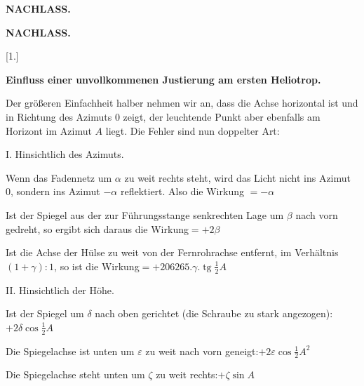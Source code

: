 \clearpage
\noindent{}\hfill{\small\textbf{NACHLASS.}}\hfill\null\par
\vspace*{32mm}
\begin{center}
{\Large\bfseries NACHLASS.}\par\vspace{15mm}
[1.]\par\medskip
\textbf{Einfluss einer unvollkommenen Justierung am ersten Heliotrop.}
\end{center}
Der größeren Einfachheit halber nehmen wir an, dass die Achse horizontal
ist und in Richtung des Azimuts 0 zeigt, der leuchtende Punkt aber ebenfalls
am Horizont im Azimut $A$ liegt. Die Fehler sind nun doppelter Art:

\noindent I. Hinsichtlich des Azimuts.
\begin{list}{}{\setlength{\leftmargin}{9mm}\setlength{\labelwidth}{6mm}\setlength{\itemsep}{2pt}\setlength{\parsep}{0pt}\setlength{\topsep}{3pt}}
\item[1.] Wenn das Fadennetz um $\alpha$ zu weit rechts steht,
wird das Licht nicht ins Azimut 0, sondern ins Azimut
$-\alpha$ reflektiert. Also die Wirkung $=-\alpha$
\item[2.] Ist der Spiegel aus der zur Führungsstange
senkrechten Lage um $\beta$ nach vorn gedreht, so
ergibt sich daraus die Wirkung\hfill $=+2\beta$
\item[3.] Ist die Achse der Hülse zu weit von der Fernrohrachse
entfernt, im Verhältnis $(1+\gamma):1$, so ist die
Wirkung\hfill $=+206265.\gamma.\operatorname{tg}\frac12 A$
\end{list}
\noindent II. Hinsichtlich der Höhe.
\begin{list}{}{\setlength{\leftmargin}{9mm}\setlength{\labelwidth}{6mm}\setlength{\itemsep}{2pt}\setlength{\parsep}{0pt}\setlength{\topsep}{3pt}}
\item[4.] Ist der Spiegel um $\delta$ nach oben gerichtet
(die Schraube zu stark angezogen):\hfill $+2\delta\cos\frac12 A$
\item[5.] Die Spiegelachse ist unten um $\varepsilon$ zu weit
nach vorn geneigt:\hfill $+2\varepsilon\cos\frac12 A^2$
\item[6.] Die Spiegelachse steht unten um $\zeta$ zu weit rechts:\hfill $+\zeta\sin A$
\end{list}

